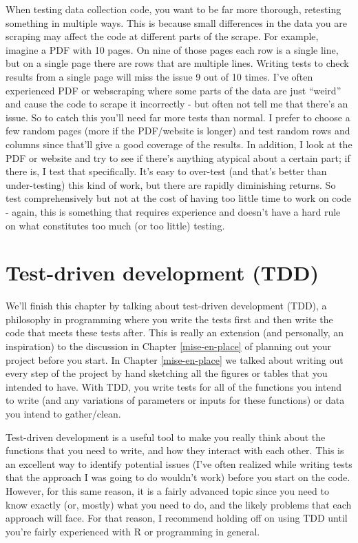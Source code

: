 \documentclass[
  12pt,
  openany]{book}
\begin{document}
When testing data collection code, you want to be far more thorough, retesting something in multiple ways. This is because small differences in the data you are scraping may affect the code at different parts of the scrape. For example, imagine a PDF with 10 pages. On nine of those pages each row is a single line, but on a single page there are rows that are multiple lines. Writing tests to check results from a single page will miss the issue 9 out of 10 times. I've often experienced PDF or webscraping where some parts of the data are just ``weird'' and cause the code to scrape it incorrectly - but often not tell me that there's an issue. So to catch this you'll need far more tests than normal. I prefer to choose a few random pages (more if the PDF/website is longer) and test random rows and columns since that'll give a good coverage of the results. In addition, I look at the PDF or website and try to see if there's anything atypical about a certain part; if there is, I test that specifically. It's easy to over-test (and that's better than under-testing) this kind of work, but there are rapidly diminishing returns. So test comprehensively but not at the cost of having too little time to work on code - again, this is something that requires experience and doesn't have a hard rule on what constitutes too much (or too little) testing.

\hypertarget{test-driven-development-tdd}{%
\section{Test-driven development (TDD)}\label{test-driven-development-tdd}}

We'll finish this chapter by talking about test-driven development (TDD), a philosophy in programming where you write the tests first and then write the code that meets these tests after. This is really an extension (and personally, an inspiration) to the discussion in Chapter \ref{mise-en-place} of planning out your project before you start. In Chapter \ref{mise-en-place} we talked about writing out every step of the project by hand sketching all the figures or tables that you intended to have. With TDD, you write tests for all of the functions you intend to write (and any variations of parameters or inputs for these functions) or data you intend to gather/clean.

Test-driven development is a useful tool to make you really think about the functions that you need to write, and how they interact with each other. This is an excellent way to identify potential issues (I've often realized while writing tests that the approach I was going to do wouldn't work) before you start on the code. However, for this same reason, it is a fairly advanced topic since you need to know exactly (or, mostly) what you need to do, and the likely problems that each approach will face. For that reason, I recommend holding off on using TDD until you're fairly experienced with R or programming in general.
\end{document}
